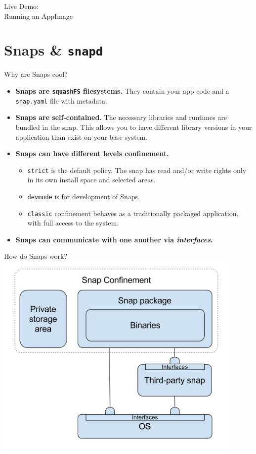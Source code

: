 \documentclass{lug}
\begin{document}
\begin{frame}[standout]
    \Huge
    Live Demo:\\
    Running an AppImage
\end{frame}

\section{Snaps \& \texttt{snapd}}
\begin{frame}{Why are Snaps cool?}
    \begin{itemize}
        \item \textbf{Snaps are \texttt{squashFS} filesystems.} They contain
            your app code and a \texttt{snap.yaml} file with metadata.
        \item \textbf{Snaps are self-contained.} The necessary libraries and
            runtimes are bundled in the snap. This allows you to have different
            library versions in your application than exist on your base system.
        \item \textbf{Snaps can have different levels confinement.}
            \begin{itemize}
                \small
                \item \texttt{strict} is the default policy. The snap has read
                    and/or write rights only in its own install space and
                    selected areas.
                \item \texttt{devmode} is for development of Snaps.
                \item \texttt{classic} confinement behaves as a traditionally
                    packaged application, with full access to the system.
            \end{itemize}
        \item \textbf{Snaps can communicate with one another via
            \textit{interfaces}.}
    \end{itemize}
\end{frame}

\begin{frame}{How do Snaps work?}
    \center
    \includegraphics[width=0.9\textwidth]{./graphics/snap_arch}
\end{frame}
\end{document}
